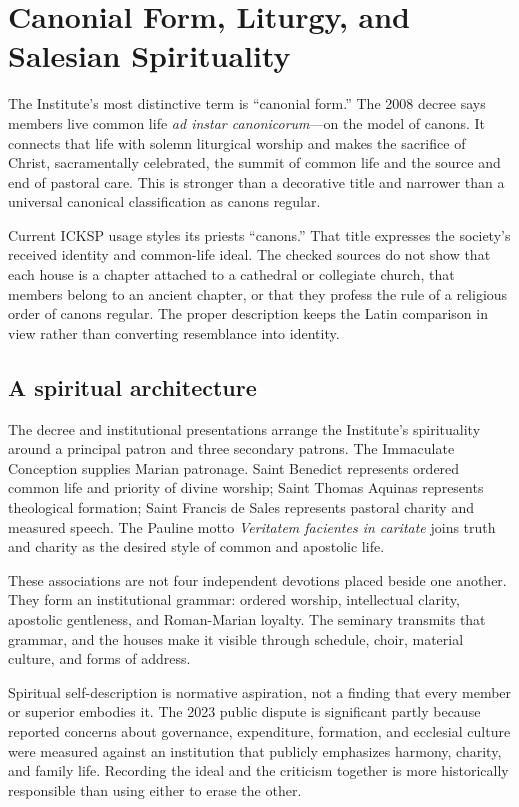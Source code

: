 \section{Canonial Form, Liturgy, and Salesian Spirituality}

The Institute's most distinctive term is ``canonial form.'' The 2008 decree says members live common life \emph{ad instar canonicorum}---on the model of canons. It connects that life with solemn liturgical worship and makes the sacrifice of Christ, sacramentally celebrated, the summit of common life and the source and end of pastoral care. This is stronger than a decorative title and narrower than a universal canonical classification as canons regular.

Current ICKSP usage styles its priests ``canons.'' That title expresses the society's received identity and common-life ideal. The checked sources do not show that each house is a chapter attached to a cathedral or collegiate church, that members belong to an ancient chapter, or that they profess the rule of a religious order of canons regular. The proper description keeps the Latin comparison in view rather than converting resemblance into identity.

\subsection{A spiritual architecture}

The decree and institutional presentations arrange the Institute's spirituality around a principal patron and three secondary patrons. The Immaculate Conception supplies Marian patronage. Saint Benedict represents ordered common life and priority of divine worship; Saint Thomas Aquinas represents theological formation; Saint Francis de Sales represents pastoral charity and measured speech. The Pauline motto \emph{Veritatem facientes in caritate} joins truth and charity as the desired style of common and apostolic life.

These associations are not four independent devotions placed beside one another. They form an institutional grammar: ordered worship, intellectual clarity, apostolic gentleness, and Roman-Marian loyalty. The seminary transmits that grammar, and the houses make it visible through schedule, choir, material culture, and forms of address.

Spiritual self-description is normative aspiration, not a finding that every member or superior embodies it. The 2023 public dispute is significant partly because reported concerns about governance, expenditure, formation, and ecclesial culture were measured against an institution that publicly emphasizes harmony, charity, and family life. Recording the ideal and the criticism together is more historically responsible than using either to erase the other.

